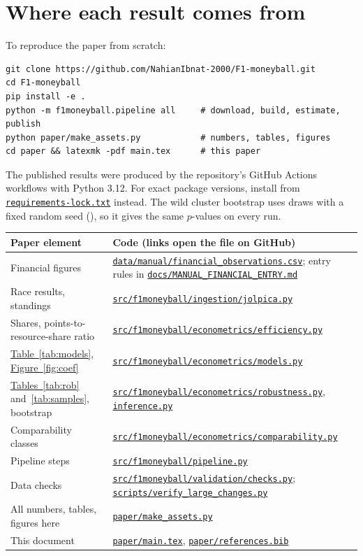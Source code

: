 \documentclass[11pt,a4paper]{article}
\newcommand{\repo}{https://github.com/NahianIbnat-2000/F1-moneyball}
\newcommand{\code}[1]{\href{\repo/blob/main/#1}{\nolinkurl{#1}}}
\begin{document}
\FloatBarrier
\section{Where each result comes from}
\label{app:code}

\noindent To reproduce the paper from scratch:
\begin{verbatim}
git clone https://github.com/NahianIbnat-2000/F1-moneyball.git
cd F1-moneyball
pip install -e .
python -m f1moneyball.pipeline all     # download, build, estimate, publish
python paper/make_assets.py            # numbers, tables, figures
cd paper && latexmk -pdf main.tex      # this paper
\end{verbatim}
\noindent The published results were produced by the repository's GitHub Actions workflows with Python 3.12. For exact
package versions, install from \code{requirements-lock.txt} instead. The wild cluster bootstrap uses \BootDraws{} draws
with a fixed random seed (\BootSeed), so it gives the same $p$-values on every run.

\begin{table}[htbp]
\centering
\small
\begin{tabularx}{\textwidth}{@{}lX@{}}
\toprule
Paper element & Code (links open the file on GitHub) \\
\midrule
Financial figures & \code{data/manual/financial_observations.csv}; entry rules in \code{docs/MANUAL_FINANCIAL_ENTRY.md} \\
Race results, standings & \code{src/f1moneyball/ingestion/jolpica.py} \\
Shares, points-to-resource-share ratio & \code{src/f1moneyball/econometrics/efficiency.py} \\
\hyperref[tab:models]{Table~\ref*{tab:models}}, \hyperref[fig:coef]{Figure~\ref*{fig:coef}} & \code{src/f1moneyball/econometrics/models.py} \\
\hyperref[tab:rob]{Tables~\ref*{tab:rob}} and~\hyperref[tab:samples]{\ref*{tab:samples}}, bootstrap & \code{src/f1moneyball/econometrics/robustness.py}, \code{inference.py} \\
Comparability classes & \code{src/f1moneyball/econometrics/comparability.py} \\
Pipeline steps & \code{src/f1moneyball/pipeline.py} \\
Data checks & \code{src/f1moneyball/validation/checks.py}; \code{scripts/verify_large_changes.py} \\
All numbers, tables, figures here & \code{paper/make_assets.py} \\
This document & \code{paper/main.tex}, \code{paper/references.bib} \\
\bottomrule
\end{tabularx}
\end{table}
\end{document}
